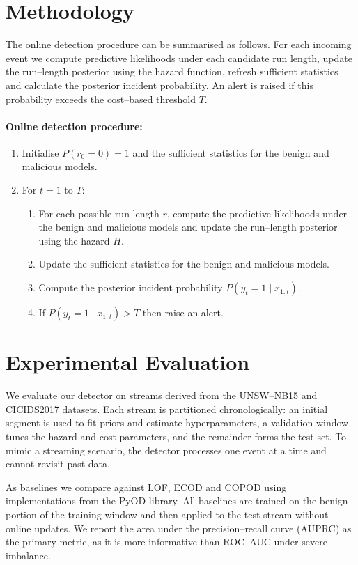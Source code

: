 \documentclass{article}
\begin{document}
\section{Methodology}
The online detection procedure can be summarised as follows.  For each incoming event we compute predictive likelihoods under each candidate run length, update the run--length posterior using the hazard function, refresh sufficient statistics and calculate the posterior incident probability.  An alert is raised if this probability exceeds the cost--based threshold $T$.

\paragraph{Online detection procedure:}
\begin{enumerate}
  \item Initialise $P(r_0=0)=1$ and the sufficient statistics for the benign and malicious models.
  \item For $t = 1$ to $T$:
    \begin{enumerate}
      \item For each possible run length $r$, compute the predictive likelihoods under the benign and malicious models and update the run--length posterior using the hazard $H$.
      \item Update the sufficient statistics for the benign and malicious models.
      \item Compute the posterior incident probability $P(y_t=1\mid x_{1:t})$.
      \item If $P(y_t=1\mid x_{1:t}) > T$ then raise an alert.
    \end{enumerate}
\end{enumerate}

\section{Experimental Evaluation}
We evaluate our detector on streams derived from the UNSW--NB15 and CICIDS2017 datasets.  Each stream is partitioned chronologically: an initial segment is used to fit priors and estimate hyperparameters, a validation window tunes the hazard and cost parameters, and the remainder forms the test set.  To mimic a streaming scenario, the detector processes one event at a time and cannot revisit past data.

As baselines we compare against LOF, ECOD and COPOD using implementations from the PyOD library.  All baselines are trained on the benign portion of the training window and then applied to the test stream without online updates.  We report the area under the precision--recall curve (AUPRC) as the primary metric, as it is more informative than ROC--AUC under severe imbalance.
\end{document}
